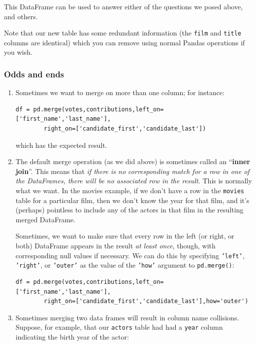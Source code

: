 This DataFrame can be used to answer either of the questions we posed above,
and others.

Note that our new table has some redundant information (the \texttt{film} and
\texttt{title} columns are identical) which you can remove using normal Pandas
operations if you wish.

\subsubsection{Odds and ends}

\begin{enumerate}
\itemsep1em
\item Sometimes we want to merge on more than one column; for instance:

\begin{Verbatim}[fontsize=\small,samepage=true,frame=single]
df = pd.merge(votes,contributions,left_on=['first_name','last_name'],
        right_on=['candidate_first','candidate_last'])
\end{Verbatim}
which has the expected result.

\item The default merge operation (as we did above) is sometimes called an
``\textbf{inner join}''. This means that \textit{if there is no corresponding
match for a row in one of the DataFrames, there will be no associated row in
the result.} This is normally what we want. In the movies example, if we don't
have a row in the \texttt{movies} table for a particular film, then we don't
know the year for that film, and it's (perhaps) pointless to include any of
the actors in that film in the resulting merged DataFrame.

Sometimes, we want to make sure that every row in the left (or right, or
both) DataFrame appears in the result \textit{at least once}, though, with
corresponding null values if necessary. We can do this by specifying
\texttt{'left'}, \texttt{'right'}, or \texttt{'outer'} as the value of the
\texttt{'how'} argument to \texttt{pd.merge()}:

\begin{Verbatim}[fontsize=\small,samepage=true,frame=single]
df = pd.merge(votes,contributions,left_on=['first_name','last_name'],
        right_on=['candidate_first','candidate_last'],how='outer')
\end{Verbatim}

\item Sometimes merging two data frames will result in column name
collisions. Suppose, for example, that our \texttt{actors} table had had a
\texttt{year} column indicating the birth year of the actor:


\end{enumerate}

